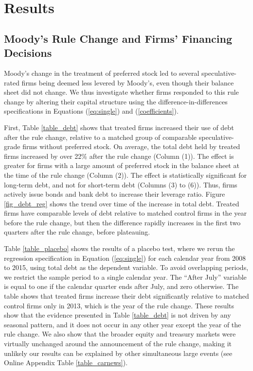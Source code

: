 \documentclass[a4paper, 12pt]{article}
\begin{document}
\section{Results}

\subsection{Moody's Rule Change and Firms' Financing Decisions}\label{sec_fin}

Moody's change in the treatment of preferred stock led to several speculative-rated firms being deemed less levered by Moody's, even though their balance sheet did not change. We thus investigate whether firms responded to this rule change by altering their capital structure using the difference-in-differences specifications in Equations (\ref{eq:single}) and (\ref{coefficients}).

First, Table \ref{table_debt} shows that treated firms increased their use of debt after the rule change, relative to a matched group of comparable speculative-grade firms without preferred stock. On average, the total debt held by treated firms increased by over 22\% after the rule change (Column (1)). The effect is greater for firms with a large amount of preferred stock in the balance sheet at the time of the rule change (Column (2)). The effect is statistically significant for long-term debt, and not for short-term debt (Columns (3) to (6)). Thus, firms actively issue bonds and bank debt to increase their leverage ratio. Figure \ref{fig_debt_reg} shows the trend over time of the increase in total debt. Treated firms have comparable levels of debt relative to matched control firms in the year before the rule change, but then the difference rapidly increases in the first two quarters after the rule change, before plateauing.

Table \ref{table_placebo} shows the results of a placebo test, where we rerun the regression specification in Equation (\ref{eq:single}) for each calendar year from 2008 to 2015, using total debt as the dependent variable. To avoid overlapping periods, we restrict the sample period to a single calendar year. The ``After July'' variable is equal to one if the calendar quarter ends after July, and zero otherwise. The table shows that treated firms increase their debt significantly relative to matched control firms only in 2013, which is the year of the rule change. These results show that the evidence presented in Table \ref{table_debt} is not driven by any seasonal pattern, and it does not occur in any other year except the year of the rule change. We also show that the broader equity and treasury markets were virtually unchanged around the announcement of the rule change, making it unlikely our results can be explained by other simultaneous large events (see Online Appendix Table \ref{table_carnews}).
\end{document}
